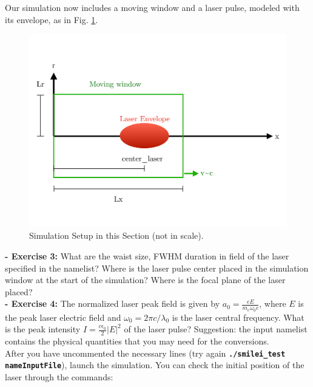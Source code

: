 \documentclass{article}
\newcommand{\commandline}[1]{\texttt{\textbf{#1}}}
\begin{document}
Our simulation now includes a moving window and a laser pulse, modeled with its envelope, as in Fig. \ref{Schema1}.\\

\begin{figure}[h!]
  \begin{center}
  \includegraphics[scale=0.3]{Schema_Simulation_1.pdf}
  \end{center}
  \caption{Simulation Setup in this Section (not in scale).}
  \label{Schema1}
\end{figure}

\textbf{ - Exercise 3:} What are the waist size, FWHM duration in field of the laser specified in the namelist? Where is the laser pulse center placed in the simulation window at the start of the simulation? Where is the focal plane of the laser placed?\\

\textbf{ - Exercise 4:} The normalized laser peak field is given by $a_0=\frac{eE}{m_e\omega_0 c}$, where $E$ is the peak laser electric field and $\omega_0=2\pi c/\lambda_0$ is the laser central frequency. What is the peak intensity $I=\frac{c\epsilon_0}{2}|E|^2$ of the laser pulse? Suggestion: the input namelist contains the physical quantities that you may need for the conversions.\\

After you have uncommented the necessary lines (try again \commandline{./smilei\_test nameInputFile}), launch the simulation. You can check the initial position of the laser through the commands:\\
\end{document}
